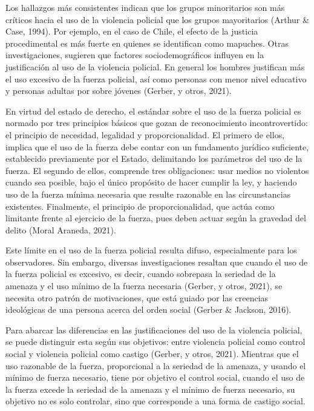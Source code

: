 \documentclass[12pt,twoside]{templates/facsothesis}
\begin{document}
Los hallazgos más consistentes indican que los grupos minoritarios son más críticos hacia el uso de la violencia policial que los grupos mayoritarios (Arthur \& Case, 1994). Por ejemplo, en el caso de Chile, el efecto de la justicia procedimental es más fuerte en quienes se identifican como mapuches. Otras investigaciones, sugieren que factores sociodemográficos influyen en la justificación al uso de la violencia policial. En general los hombres justifican más el uso excesivo de la fuerza policial, así como personas con menor nivel educativo y personas adultas por sobre jóvenes (Gerber, y otros, 2021).

En virtud del estado de derecho, el estándar sobre el uso de la fuerza policial es normado por tres principios básicos que gozan de reconocimiento incontrovertido: el principio de necesidad, legalidad y proporcionalidad. El primero de ellos, implica que el uso de la fuerza debe contar con un fundamento jurídico suficiente, establecido previamente por el Estado, delimitando los parámetros del uso de la fuerza. El segundo de ellos, comprende tres obligaciones: usar medios no violentos cuando sea posible, bajo el único propósito de hacer cumplir la ley, y haciendo uso de la fuerza mínima necesaria que resulte razonable en las circunstancias existentes. Finalmente, el principio de proporcionalidad, que actúa como limitante frente al ejercicio de la fuerza, pues deben actuar según la gravedad del delito (Moral Araneda, 2021).

Este límite en el uso de la fuerza policial resulta difuso, especialmente para los observadores. Sin embargo, diversas investigaciones resaltan que cuando el uso de la fuerza policial es excesivo, es decir, cuando sobrepasa la seriedad de la amenaza y el uso mínimo de la fuerza necesaria (Gerber, y otros, 2021), se necesita otro patrón de motivaciones, que está guiado por las creencias ideológicas de una persona acerca del orden social (Gerber \& Jackson, 2016).

Para abarcar las diferencias en las justificaciones del uso de la violencia policial, se puede distinguir esta según sus objetivos: entre violencia policial como control social y violencia policial como castigo (Gerber, y otros, 2021). Mientras que el uso razonable de la fuerza, proporcional a la seriedad de la amenaza, y usando el mínimo de fuerza necesario, tiene por objetivo el control social, cuando el uso de la fuerza excede la seriedad de la amenaza y el mínimo de fuerza necesario, su objetivo no es solo controlar, sino que corresponde a una forma de castigo social.
\end{document}
